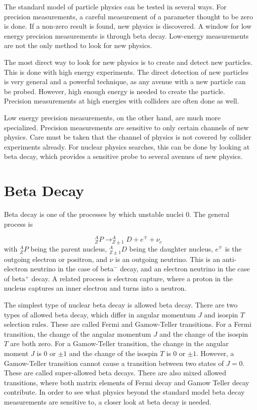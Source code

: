 \documentclass[../MaxHughesThesis.tex]{subfiles}
\begin{document}
The standard model of particle physics can be tested in several ways.
For precision measurements, a careful measurement of a parameter thought to be zero is done.
If a non-zero result is found, new physics is discovered.
A window for low energy precision measurements is through beta decay.
Low-energy measurements are not the only method to look for new physics.

The most direct way to look for new physics is to create and detect new particles.
This is done with high energy experiments. 
The direct detection of new particles is very general and a powerful technique, as any avenue with a new particle can be probed.
However, high enough energy is needed to create the particle.
Precision measurements at high energies with colliders are often done as well. 
 
Low energy precision measurements, on the other hand, are much more specialized.
Precision measurements are sensitive to only certain channels of new physics.
Care must be taken that the channel of physics is not covered by collider experiments already.
For nuclear physics searches, this can be done by looking at beta decay, which provides a sensitive probe to several avenues of new physics.

\section{Beta Decay}
Beta decay is one of the processes by which unstable nuclei 0. 
The general process is %

\begin{equation}
	\label{eq:betadecay}
	^{A}_{Z}P \rightarrow ^{A}_{Z\pm 1}D + e^{\mp} + \nu_{e}
\end{equation}
with $^{A}_{Z}P$ being the parent nucleus, $^{A}_{Z \pm 1}D$ being the daughter nucleus, $e^{\mp}$ is the outgoing electron or positron, and $\nu$ is an outgoing neutrino.
This is an anti-electron neutrino in the case of beta$^{-}$ decay, and an electron neutrino in the case of beta$^{+}$ decay. 
A related process is electron capture, where a proton in the nucleus captures an inner electron and turns into a neutron.

The simplest type of nuclear beta decay is allowed beta decay.
There are two types of allowed beta decay, which differ in angular momentum $J$ and isospin $T$ selection rules.
These are called Fermi and Gamow-Teller transitions. 
For a Fermi transition, the change of the angular momentum $J$ and the change of the isospin $T$ are both zero.
For a Gamow-Teller transition, the change in the angular moment $J$ is $0$ or $\pm1$ and the change of the isospin $T$ is $0$ or $\pm 1$.
However, a Gamow-Teller transition cannot cause a transition between two states of $J = 0$. 
These are called super-allowed beta decays.
There are also mixed allowed transitions, where both matrix elements of Fermi decay and Gamow Teller decay contribute.
In order to see what physics beyond the standard model beta decay measurements are sensitive to, a closer look at beta decay is needed.
\end{document}
